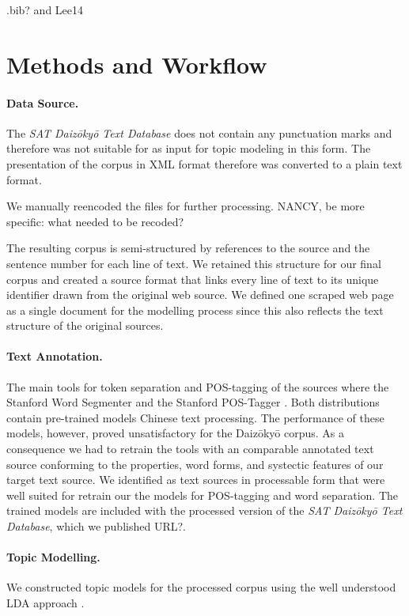 \documentclass[a4paper,10pt]{article}
\newcommand{\TODO}[1]{\begingroup\color{red}#1\endgroup}
\begin{document}
\TODO{ .bib? and Lee14}

\section{Methods and Workflow} 

\paragraph{Data Source.} The \textit{SAT Daiz{\=o}ky{\=o} Text
    Database}  does not contain any
  punctuation marks and therefore was not suitable for as input for topic
  modeling in this form. The presentation of the corpus in XML format
  \TODO{\cite{DaiCD}} therefore was converted to a plain text format.
  
  We manually reencoded the files for further processing.
  \TODO{NANCY, be more specific: what needed to be recoded?} 

  The resulting corpus is semi-structured by references to the source and
  the sentence number for each line of text. We retained this structure for
  our final corpus and created a source format that links every line of
  text to its unique identifier drawn from the original web source. We
  defined one scraped web page as a single document for the modelling
  process since this also reflects the text structure of the original
  sources.
    
\paragraph{Text Annotation.} 
  The main tools for token separation and POS-tagging of the sources where
  the Stanford Word Segmenter and the Stanford POS-Tagger
  \TODO{\cite{***}}. Both distributions contain pre-trained models Chinese
  text processing. The performance of these models, however, proved
  unsatisfactory for the Daiz{\=o}ky{\=o} corpus. As a consequence we had
  to retrain the tools with an comparable annotated text source conforming
  to the properties, word forms, and \TODO{systectic} features of our
  target text source.  We identified \cite{Lee:12,Wong:16} as text sources
  in processable form that were well suited for retrain our the models for
  POS-tagging and word separation. The trained models are included with the
  processed version of the \textit{SAT Daiz{\=o}ky{\=o} Text Database},
  which we published \TODO{URL?}.

\paragraph{Topic Modelling.}
  We constructed topic models for the processed corpus using the well
  understood LDA approach \cite{Blei03,GriffithStyvers05}.
  
\end{document}
